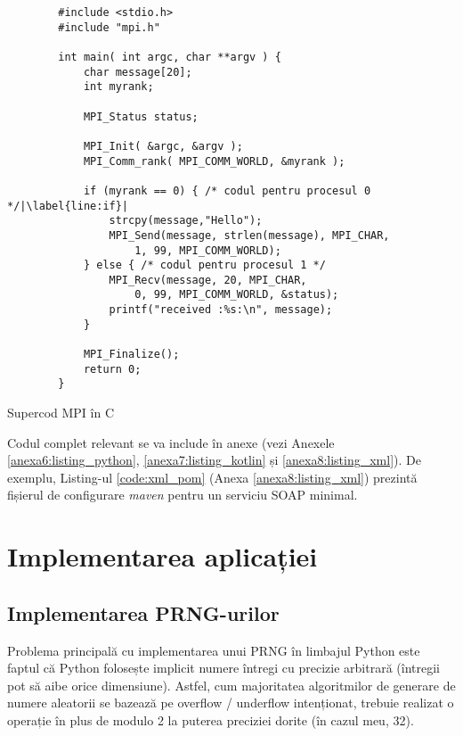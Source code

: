 \begin{code}
    \begin{verbatim}
        #include <stdio.h>
        #include "mpi.h"
        
        int main( int argc, char **argv ) {
        	char message[20];
        	int myrank;	
        		
        	MPI_Status status;
        
        	MPI_Init( &argc, &argv );
        	MPI_Comm_rank( MPI_COMM_WORLD, &myrank );
        	
        	if (myrank == 0) { /* codul pentru procesul 0 */|\label{line:if}|
        		strcpy(message,"Hello");
        		MPI_Send(message, strlen(message), MPI_CHAR, 
        			1, 99, MPI_COMM_WORLD);
        	} else { /* codul pentru procesul 1 */
        		MPI_Recv(message, 20, MPI_CHAR, 
        			0, 99, MPI_COMM_WORLD, &status);
        		printf("received :%s:\n", message);
        	}
        	
        	MPI_Finalize();
        	return 0;
        }
    \end{verbatim}
    \caption{Supercod MPI în C} 
    \label{code:c_mpi}
\end{code}

Codul complet relevant se va include în anexe (vezi Anexele \ref{anexa6:listing_python}, \ref{anexa7:listing_kotlin} și \ref{anexa8:listing_xml}). De exemplu, Listing-ul \ref{code:xml_pom} (Anexa \ref{anexa8:listing_xml}) prezintă fișierul de configurare \textit{maven} pentru un serviciu SOAP minimal.

\textcolor{gray}{\lipsum}

\textcolor{gray}{\lipsum}
\fi

\chapter{Implementarea aplicației}
\label{cap:cap3}

\section{Implementarea PRNG-urilor}

Problema principală cu implementarea unui PRNG în limbajul Python este faptul că Python folosește implicit numere întregi cu precizie arbitrară (întregii pot să aibe orice dimensiune). Astfel, cum majoritatea algoritmilor de generare de numere aleatorii se bazează pe overflow / underflow intenționat, trebuie realizat o operație în plus de modulo 2 la puterea preciziei dorite (în cazul meu, 32).

